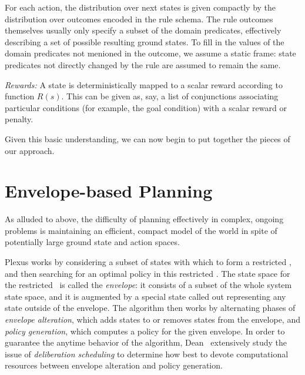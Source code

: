 For each action, the distribution over
next states is given compactly by the distribution over outcomes encoded in
the rule schema.  The rule
outcomes themselves usually only specify a subset of the domain
predicates, effectively describing a set of possible resulting
ground states.  To fill in the values of the domain predicates not
menioned in the outcome, we assume a static frame: state predicates
not directly changed by the rule are assumed to remain the same.

\emph{Rewards:} A state is deterministically mapped to a scalar reward
  according to function $R(s)$. 
This can be given as, say, a list of conjunctions associating particular
conditions (for example, the goal condition) with a scalar reward or
penalty.

Given this basic understanding, we can now begin to put together the
pieces
of our approach. 



\section{Envelope-based Planning}

As alluded to above, the difficulty of planning effectively in
complex, ongoing problems is maintaining an efficient, compact model
of the world in spite of potentially large ground state and action
spaces.




Plexus works by considering a subset of states with which to form a
restricted \mdp, and then searching for an optimal policy in this
restricted \mdp.  The state space for the restricted \mdp\ is called
the \emph{envelope}: it consists of a subset of the whole system state
space, and it is augmented by a special state called {\sc out}
representing any state outside of the envelope.  The algorithm then
works by alternating phases of \emph{envelope alteration}, which adds states to
or removes states from the envelope, and \emph{policy generation}, which
computes a policy for the given envelope. In order to guarantee the
anytime behavior of the algorithm, Dean \etal\ extensively study the
issue of \emph{deliberation scheduling} to determine how best to
devote computational resources between envelope alteration and policy
generation.

